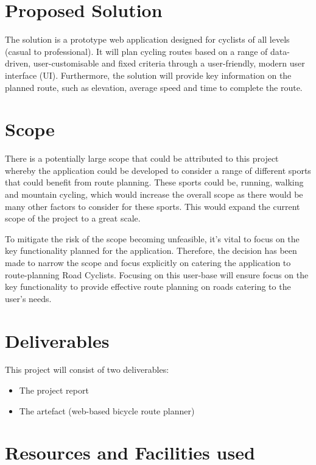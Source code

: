 \section{Proposed Solution}
\label{intro:proposedsolution}

The solution is a prototype web application designed for cyclists of all levels (casual to professional). It will plan cycling routes based on a range of data-driven, user-customisable and fixed criteria through a user-friendly, modern user interface (UI). Furthermore, the solution will provide key information on the planned route, such as elevation, average speed and time to complete the route.

\section{Scope}
\label{intro:scope}

There is a potentially large scope that could be attributed to this project whereby the application could be developed to consider a range of different sports that could benefit from route planning. These sports could be, running, walking and mountain cycling, which would increase the overall scope as there would be many other factors to consider for these sports. This would expand the current scope of the project to a great scale.

To mitigate the risk of the scope becoming unfeasible, it's vital to focus on the key functionality planned for the application. Therefore, the decision has been made to narrow the scope and focus explicitly on catering the application to route-planning Road Cyclists. Focusing on this user-base will ensure focus on the key functionality to provide effective route planning on roads catering to the user's needs.

\section{Deliverables}
\label{intro:deliverables}

This project will consist of two deliverables:
\begin{itemize}
    \item The project report
    \item The artefact (web-based bicycle route planner)
\end{itemize}

\section{Resources and Facilities used}
\label{intro:resourcesandfacilities}

